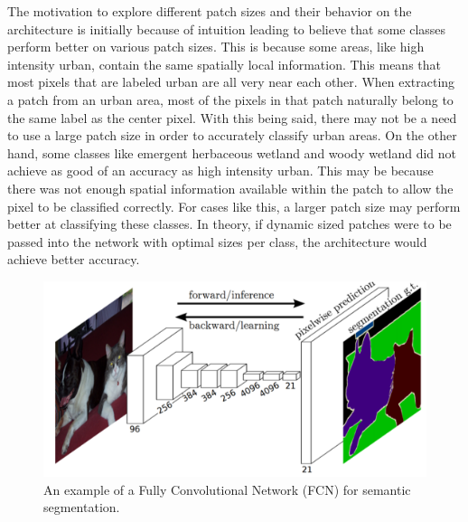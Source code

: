 \documentclass[letterpaper, 10 pt, conference]{ieeeconf}  %
\begin{document}
The motivation to explore different patch sizes and their behavior on the architecture is initially because of intuition leading to believe that some classes perform better on various patch sizes. This is because some areas, like high intensity urban, contain the same spatially local information. This means that most pixels that are labeled urban are all very near each other. When extracting a patch from an urban area, most of the pixels in that patch naturally belong to the same label as the center pixel. With this being said, there may not be a need to use a large patch size in order to accurately classify urban areas. On the other hand, some classes like emergent herbaceous wetland and woody wetland did not achieve as good of an accuracy as high intensity urban. This may be because there was not enough spatial information available within the patch to allow the pixel to be classified correctly. For cases like this, a larger patch size may perform better at classifying these classes. In theory, if dynamic sized patches were to be passed into the network with optimal sizes per class, the architecture would achieve better accuracy.

\begin{figure}[!b]
	\centering
	\includegraphics[scale=0.9]{fcn.png}
	\setlength{\belowcaptionskip}{-20pt}
	\caption{An example of a Fully Convolutional Network (FCN) for semantic segmentation.}
	\label{figurelabel}
\end{figure}
\end{document}
